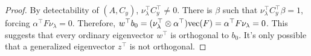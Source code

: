 \begin{proof}
By detectability of \((A,C_y)\), \(\nu_\lambda^\top C_y^\top \neq 0\). There is \(\beta\) such that \(\nu_\lambda^\top C_y^\top \beta = 1\), forcing
\(\alpha^\top F \nu_\lambda = 0\).
Therefore, \(w^\top b_0 = (\nu_\lambda^\top \otimes\alpha^\top ){\mathrm{vec}}(F)=\alpha^\top F\nu_\lambda =0\).
This suggests that every ordinary eigenvector \(w^\top\) is orthogonal to \(b_0\). It's only possible that a generalized eigenvector \(z^\top\) is not orthogonal.


\end{proof}
